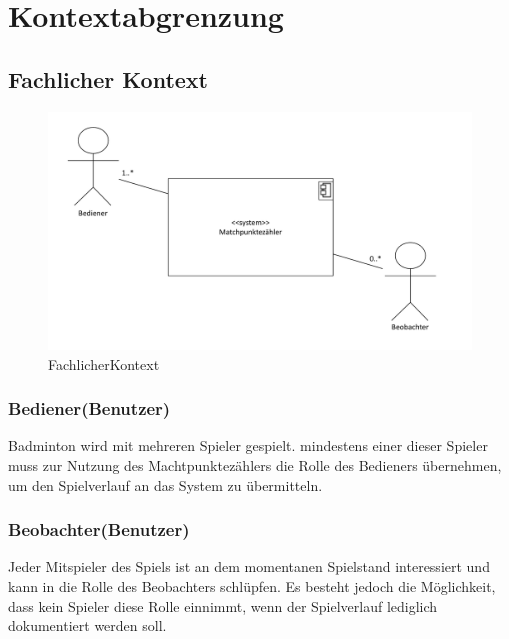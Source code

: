 \chapter{Kontextabgrenzung}

\section{Fachlicher Kontext}
\begin{figure}[H]
\begin{center}
\includegraphics[scale=0.5]{Grafiken/FachlicherKontext.pdf}
\caption{FachlicherKontext}
\end{center}
\end{figure}

\subsection*{Bediener(Benutzer)}
Badminton wird mit mehreren Spieler gespielt. mindestens einer dieser Spieler muss zur Nutzung des Machtpunktezählers die Rolle des Bedieners übernehmen, um den Spielverlauf an das System zu übermitteln.
\subsection*{Beobachter(Benutzer)}
Jeder Mitspieler des Spiels ist an dem momentanen Spielstand interessiert und kann in die Rolle des Beobachters schlüpfen. Es besteht jedoch  die Möglichkeit, dass kein Spieler diese Rolle einnimmt, wenn der Spielverlauf lediglich dokumentiert werden soll.

